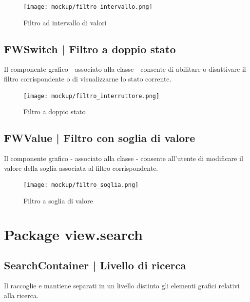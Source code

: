 \documentclass[10pt,a4paper,headinclude,footinclude,hidelinks]{scrreprt} %
\begin{document}
	\begin{figure}[ht]
		\begin{center}
	    	\texttt{[image: mockup/filtro\_intervallo.png]}
			\label{gfx:mockup:filter:range}
			\caption{Filtro ad intervallo di valori}
		\end{center}
	\end{figure}

	\subsection[FWSwitch]{FWSwitch | Filtro a doppio stato}
	\label{sec:stage:design:view.filter:switch-filter}
	Il componente grafico - associato alla classe \textit{} - consente di abilitare o disattivare il filtro corrispondente o di visualizzarne lo stato corrente.

	\begin{figure}[ht]
		\begin{center}
	    	\texttt{[image: mockup/filtro\_interruttore.png]}
			\label{gfx:mockup:filter:switch}
			\caption{Filtro a doppio stato}
		\end{center}
	\end{figure}

	\subsection[FWValue]{FWValue | Filtro con soglia di valore}
	\label{sec:stage:design:view.filter:value-filter}
	Il componente grafico - associato alla classe \textit{} - consente all'utente di modificare il valore della soglia associata al filtro corrispondente.

	\begin{figure}[ht]
		\begin{center}
	    	\texttt{[image: mockup/filtro\_soglia.png]}
			\label{gfx:mockup:filter:value}
			\caption{Filtro a soglia di valore}
		\end{center}
	\end{figure}

	\section{Package view.search}
	\label{sec:stage:design:view.search}

	\subsection[SearchContainer]{SearchContainer | Livello di ricerca}
	\label{sec:stage:design:view.search:search-container}
	Il \textit{} raccoglie e mantiene separati in un livello distinto gli elementi grafici relativi alla ricerca.
\end{document}

